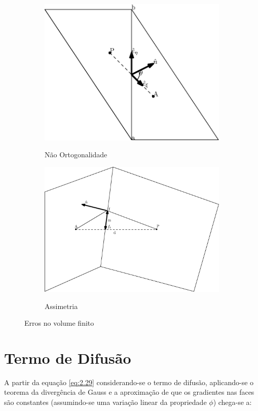 \begin{figure}
    \begin{subfigure}{.5\textwidth}
        \centering
        \caption{Não Ortogonalidade}
        \includegraphics[width=.8\linewidth]{fig/nao-ortogo}
        \label{nao-ortogo}
    \end{subfigure}
    \begin{subfigure}{.5\textwidth}
        \centering
        \caption{Assimetria}
        \includegraphics[width=.8\linewidth]{fig/assimetria.eps}
        \label{fig:assimetria}
    \end{subfigure}

    \caption{Erros no volume finito}
\end{figure}

\section{Termo de Difusão}

A partir da equação \ref{eq:2.29} considerando-se o termo de difusão, aplicando-se o teorema da divergência de Gauss e a aproximação de que os gradientes nas faces são constantes (assumindo-se uma variação linear da propriedade $\phi$) chega-se a:

